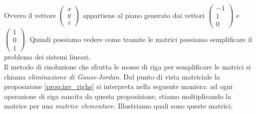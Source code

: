 Ovvero il vettore $\begin{pmatrix} x \\ y \\ z\end{pmatrix}$ appartiene al piano generato dai vettori $\begin{pmatrix} -1 \\ 1 \\ 0 \end{pmatrix}$ e $\begin{pmatrix} 1 \\ 0 \\ 1 \end{pmatrix}$. Quindi possiamo vedere come tramite le matrici possiamo semplificare
il problema dei sistemi lineari. \\
Il metodo di risoluzione che sfrutta le mosse di riga per semplificare le matrici si chiama \emph{eliminazione di Gauss-Jordan}. Dal punto di vista matriciale la proposizione \ref{prop:inv_righe} si interpreta nella seguente maniera:
ad ogni operazione di riga sancita da questa proposizione, stiamo moltiplicando la matrice per una \emph{matrice elementare}. Illustriamo quali sono queste matrici:
